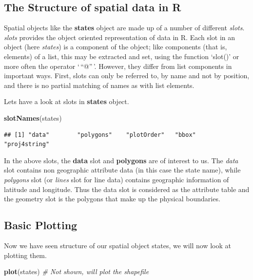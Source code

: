 \documentclass[]{article}
\newenvironment{Shaded}{}{}
\newcommand{\CommentTok}[1]{\textcolor[rgb]{0.38,0.63,0.69}{\textit{#1}}}
\newcommand{\KeywordTok}[1]{\textcolor[rgb]{0.00,0.44,0.13}{\textbf{#1}}}
\newcommand{\NormalTok}[1]{#1}
\begin{document}
\hypertarget{the-structure-of-spatial-data-in-r}{%
\subsection{The Structure of spatial data in
R}\label{the-structure-of-spatial-data-in-r}}

Spatial objects like the \textbf{states} object are made up of a number
of different \emph{slots}. \emph{slots} provides the object oriented
representation of data in R. Each slot in an object (here \emph{states})
is a component of the object; like components (that is, elements) of a
list, this may be extracted and set, using the function `slot()' or more
often the operator `\,``@''\,'. However, they differ from list
components in important ways. First, slots can only be referred to, by
name and not by position, and there is no partial matching of names as
with list elements.

Lets have a look at slots in \textbf{states} object.

\begin{Shaded}
\begin{Highlighting}[]
\KeywordTok{slotNames}\NormalTok{(states)}
\end{Highlighting}
\end{Shaded}

\begin{verbatim}
## [1] "data"        "polygons"    "plotOrder"   "bbox"        "proj4string"
\end{verbatim}

In the above slots, the \textbf{data} slot and \textbf{polygons} are of
interest to us. The \emph{data} slot contains non geographic attribute
data (in this case the state name), while \emph{polygons} slot (or
\emph{lines} slot for line data) contains geographic information of
latitude and longitude. Thus the data slot is considered as the
attribute table and the geometry slot is the polygons that make up the
physical boundaries.

\hypertarget{basic-plotting}{%
\subsection{Basic Plotting}\label{basic-plotting}}

Now we have seen structure of our spatial object states, we will now
look at plotting them.

\begin{Shaded}
\begin{Highlighting}[]
\KeywordTok{plot}\NormalTok{(states) }\CommentTok{# Not shown, will plot the shapefile}
\end{Highlighting}
\end{Shaded}
\end{document}
